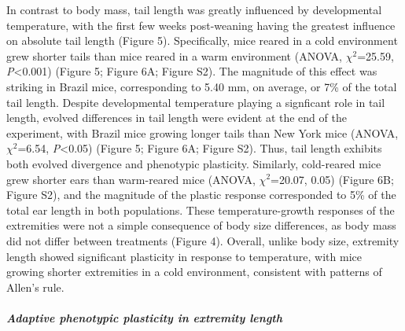\documentclass[]{article}
\let\oldsubparagraph\subparagraph
\renewcommand{\subparagraph}[1]{\oldsubparagraph{#1}\mbox{}}
\begin{document}
In contrast to body mass, tail length was greatly influenced by
developmental temperature, with the first few weeks post-weaning having
the greatest influence on absolute tail length (Figure 5). Specifically,
mice reared in a cold environment grew shorter tails than mice reared in
a warm environment (ANOVA, \(\chi^2\)=25.59, \emph{P}\textless{}0.001)
(Figure 5; Figure 6A; Figure S2). The magnitude of this effect was
striking in Brazil mice, corresponding to 5.40 mm, on average, or 7\% of
the total tail length. Despite developmental temperature playing a
signficant role in tail length, evolved differences in tail length were
evident at the end of the experiment, with Brazil mice growing longer
tails than New York mice (ANOVA, \(\chi^2\)=6.54,
\emph{P}\textless{}0.05) (Figure 5; Figure 6A; Figure S2). Thus, tail
length exhibits both evolved divergence and phenotypic plasticity.
Similarly, cold-reared mice grew shorter ears than warm-reared mice
(ANOVA, \(\chi^2\)=20.07, 0.05) (Figure 6B; Figure S2), and the
magnitude of the plastic response corresponded to 5\% of the total ear
length in both populations. These temperature-growth responses of the
extremities were not a simple consequence of body size differences, as
body mass did not differ between treatments (Figure 4). Overall, unlike
body size, extremity length showed significant plasticity in response to
temperature, with mice growing shorter extremities in a cold
environment, consistent with patterns of Allen's rule.

\vspace{2.5mm}

\hypertarget{adaptive-phenotypic-plasticity-in-extremity-length}{%
\subparagraph{\texorpdfstring{\emph{Adaptive phenotypic plasticity in
extremity
length}}{Adaptive phenotypic plasticity in extremity length}}\label{adaptive-phenotypic-plasticity-in-extremity-length}}
\end{document}
